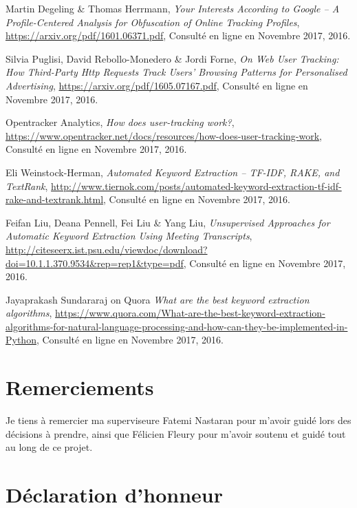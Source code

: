 \begin{thebibliography}{9}
  Martin Degeling \& Thomas Herrmann,
  \emph{Your Interests According to Google – A Profile-Centered Analysis
for Obfuscation of Online Tracking Profiles},
  \url{https://arxiv.org/pdf/1601.06371.pdf},
  Consulté en ligne en Novembre 2017,
  2016.

  Silvia Puglisi, David Rebollo-Monedero \& Jordi Forne,
  \emph{On Web User Tracking: How Third-Party Http
Requests Track Users’ Browsing Patterns for
Personalised Advertising},
  \url{https://arxiv.org/pdf/1605.07167.pdf},
  Consulté en ligne en Novembre 2017,
  2016.

  Opentracker Analytics,
  \emph{How does user-tracking work?},
  \url{https://www.opentracker.net/docs/resources/how-does-user-tracking-work},
  Consulté en ligne en Novembre 2017,
  2016.

  Eli Weinstock-Herman,
  \emph{Automated Keyword Extraction – TF-IDF, RAKE, and TextRank},
  \url{http://www.tiernok.com/posts/automated-keyword-extraction-tf-idf-rake-and-textrank.html},
  Consulté en ligne en Novembre 2017,
  2016.

  Feifan Liu, Deana Pennell, Fei Liu \& Yang Liu,
  \emph{Unsupervised Approaches for Automatic Keyword Extraction Using Meeting Transcripts},
  \url{http://citeseerx.ist.psu.edu/viewdoc/download?doi=10.1.1.370.9534&rep=rep1&type=pdf},
  Consulté en ligne en Novembre 2017,
  2016.

  Jayaprakash Sundararaj on Quora
  \emph{What are the best keyword extraction algorithms},
  \url{https://www.quora.com/What-are-the-best-keyword-extraction-algorithms-for-natural-language-processing-and-how-can-they-be-implemented-in-Python},
  Consulté en ligne en Novembre 2017,
  2016.


\end{thebibliography}

\printglossary

\chapter*{Remerciements}
Je tiens à remercier ma superviseure Fatemi Nastaran pour m'avoir guidé lors des décisions à prendre, ainsi que Félicien Fleury pour m'avoir soutenu et guidé tout au long de ce projet.

\chapter*{Déclaration d'honneur}


